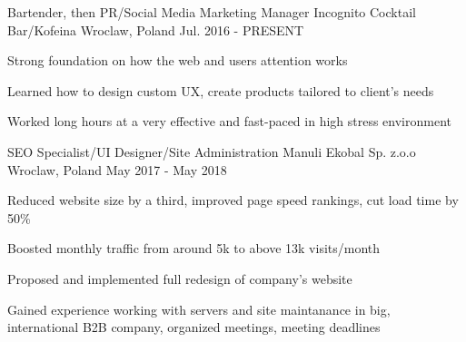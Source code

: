 
\begin{cventries}

  \cventry
    {Bartender, then PR/Social Media Marketing Manager} %
    {Incognito Cocktail Bar/Kofeina} %
    {Wroclaw, Poland} %
    {Jul. 2016 - PRESENT} %
    {
      \begin{cvitems} %
        \item Strong foundation on how the web and users attention works
        \item Learned how to design custom UX, create products tailored to client's needs
        \item Worked long hours at a very effective and fast-paced in high stress environment
      \end{cvitems}
    }

  \cventry
    {SEO Specialist/UI Designer/Site Administration} %
    {Manuli Ekobal Sp. z.o.o} %
    {Wroclaw, Poland} %
    {May 2017 - May 2018} %
    {
      \begin{cvitems} %
        \item Reduced website size by a third, improved page speed rankings, cut load time by 50\%
        \item Boosted monthly traffic from around 5k to above 13k visits/month
        \item Proposed and implemented full redesign of company's website
        \item Gained experience working with servers and site maintanance in big, international B2B company, organized meetings, meeting deadlines
      \end{cvitems}
    }

\end{cventries}
